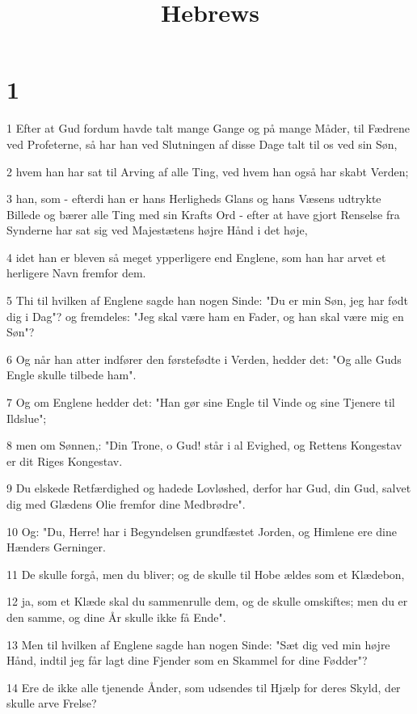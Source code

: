 

\title{Hebrews}


\chapter{1}

\par 1 Efter at Gud fordum havde talt mange Gange og på mange Måder, til Fædrene ved Profeterne, så har han ved Slutningen af disse Dage talt til os ved sin Søn,
\par 2 hvem han har sat til Arving af alle Ting, ved hvem han også har skabt Verden;
\par 3 han, som - efterdi han er hans Herligheds Glans og hans Væsens udtrykte Billede og bærer alle Ting med sin Krafts Ord - efter at have gjort Renselse fra Synderne har sat sig ved Majestætens højre Hånd i det høje,
\par 4 idet han er bleven så meget ypperligere end Englene, som han har arvet et herligere Navn fremfor dem.
\par 5 Thi til hvilken af Englene sagde han nogen Sinde: "Du er min Søn, jeg har født dig i Dag"? og fremdeles: "Jeg skal være ham en Fader, og han skal være mig en Søn"?
\par 6 Og når han atter indfører den førstefødte i Verden, hedder det: "Og alle Guds Engle skulle tilbede ham".
\par 7 Og om Englene hedder det: "Han gør sine Engle til Vinde og sine Tjenere til Ildslue";
\par 8 men om Sønnen,: "Din Trone, o Gud! står i al Evighed, og Rettens Kongestav er dit Riges Kongestav.
\par 9 Du elskede Retfærdighed og hadede Lovløshed, derfor har Gud, din Gud, salvet dig med Glædens Olie fremfor dine Medbrødre".
\par 10 Og: "Du, Herre! har i Begyndelsen grundfæstet Jorden, og Himlene ere dine Hænders Gerninger.
\par 11 De skulle forgå, men du bliver; og de skulle til Hobe ældes som et Klædebon,
\par 12 ja, som et Klæde skal du sammenrulle dem, og de skulle omskiftes; men du er den samme, og dine År skulle ikke få Ende".
\par 13 Men til hvilken af Englene sagde han nogen Sinde: "Sæt dig ved min højre Hånd, indtil jeg får lagt dine Fjender som en Skammel for dine Fødder"?
\par 14 Ere de ikke alle tjenende Ånder, som udsendes til Hjælp for deres Skyld, der skulle arve Frelse?

